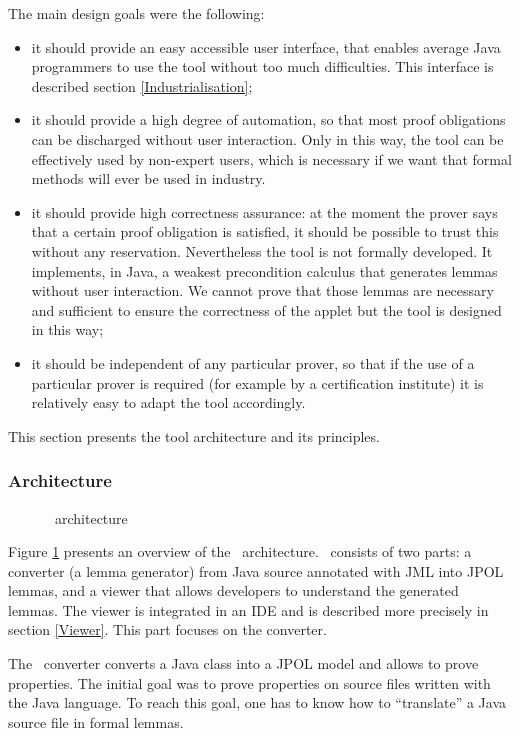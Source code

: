 \label{JavaAppletCorrectnessKit}
 The main design goals were the following:
 \begin{itemize}
 \item it should provide an easy accessible user interface, that enables average Java programmers to use the tool
 without too much difficulties. This interface is
described section \ref{Industrialisation};
 \item it should provide a high degree of automation, so that most proof obligations can be discharged without user
 interaction. Only in this way, the tool can be effectively used by non-expert users, which is necessary if we want that
 formal methods will ever be used in industry. 
 \item it should provide high correctness assurance: at the moment the prover says that a certain proof obligation
is satisfied, it should be possible to trust this without any reservation. Nevertheless
the tool is not formally developed. It implements, in Java, a weakest precondition calculus that
generates lemmas without user interaction. We cannot prove that those lemmas are necessary and sufficient to
ensure the correctness of the applet but the tool is designed in this way;
 \item it should be independent of any particular prover, so that if the use of a particular prover is
 required (for example by a certification institute) it is relatively easy to adapt the tool accordingly.
\end{itemize}


This section presents the tool architecture and its principles.
\subsubsection{Architecture}
\begin{figure}[tp]
 \caption{\JACK\ architecture}
 \label{JACKarchitecture}
\end{figure}
 Figure \ref{JACKarchitecture} presents an overview of the \JACK\
 architecture.  \JACK\ consists of two parts: a converter (a lemma generator) from
 Java source annotated with JML into JPOL lemmas, and a viewer that
 allows developers to understand the generated
 lemmas.  The viewer is integrated in an IDE and is described more precisely in section
 \ref{Viewer}.  This part focuses on the converter.

 The \JACK\ converter converts a Java class into a JPOL model and allows to
 prove properties. 
 The initial goal was to prove properties on source files written with the Java
 language.  To reach this goal, one has to know how to ``translate'' a
 Java source file in formal lemmas.  

